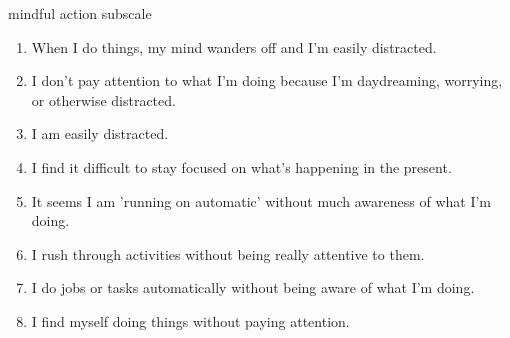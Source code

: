 \documentclass[aspectratio=169]{beamer}
\theoremstyle{remark}
\begin{document}


\begin{frame}{mindful action subscale}

    \begin{enumerate}
        \item When I do things, my mind wanders off and I'm easily distracted.
        \item I don't pay attention to what I'm doing because I'm daydreaming, worrying, or otherwise distracted.
        \item I am easily distracted.
        \item I find it difficult to stay focused on what's happening in the present.
        \item It seems I am 'running on automatic' without much awareness of what I'm doing.
        \item I rush through activities without being really attentive to them.
        \item I do jobs or tasks automatically without being aware of what I'm doing.
        \item I find myself doing things without paying attention.
    \end{enumerate}

\end{frame}
\end{document}
